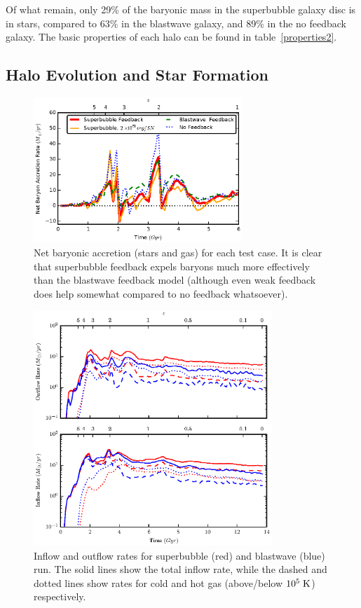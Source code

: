 Of what remain, only 29\% of the baryonic mass in the superbubble galaxy disc is
in stars, compared to 63\% in the blastwave galaxy, and 89\% in the no
feedback galaxy.  The basic properties of each halo can be found in
table~\ref{properties2}.

\subsection{Halo Evolution and Star Formation}
\begin{figure}
    \includegraphics[width=0.7\textwidth]{figures2/net_accretion.eps}
    \caption[Net baryonic accretion for different feedback models]{Net baryonic
    accretion (stars and gas) for each test case.  It is clear that superbubble
    feedback expels baryons much more effectively than the blastwave feedback
    model (although even weak feedback does help somewhat compared to no
    feedback whatsoever).}
    \label{net_accretion2}
\end{figure}
\begin{figure}
    \includegraphics[width=0.8\textwidth]{figures2/inflowoutflow.eps}
    \caption[Inflow and outflow rates for different feedback models]{Inflow and
    outflow rates for superbubble (red) and blastwave (blue) run.  The solid
    lines show the total inflow rate, while the dashed and dotted lines show
    rates for cold and hot gas (above/below $10^5\; \rm{K}$) respectively.  }
    \label{inflow_outflow2}
\end{figure}
